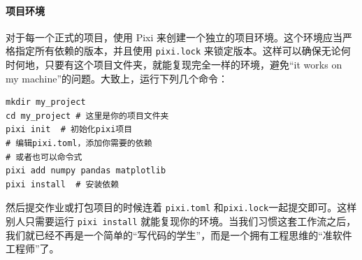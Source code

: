 \paragraph{项目环境} 对于每一个正式的项目，使用 Pixi 来创建一个独立的项目环境。这个环境应当严格指定所有依赖的版本，并且使用 \verb|pixi.lock| 来锁定版本。这样可以确保无论何时何地，只要有这个项目文件夹，就能复现完全一样的环境，避免“it works on my machine”的问题。大致上，运行下列几个命令：
\begin{verbatim}
mkdir my_project
cd my_project # 这里是你的项目文件夹
pixi init  # 初始化pixi项目
# 编辑pixi.toml，添加你需要的依赖
# 或者也可以命令式
pixi add numpy pandas matplotlib
pixi install  # 安装依赖
\end{verbatim}
然后提交作业或打包项目的时候连着 \verb|pixi.toml| 和\verb|pixi.lock|一起提交即可。这样别人只需要运行 \verb|pixi install| 就能复现你的环境。当我们习惯这套工作流之后，我们就已经不再是一个简单的“写代码的学生”，而是一个拥有工程思维的“准软件工程师”了。
